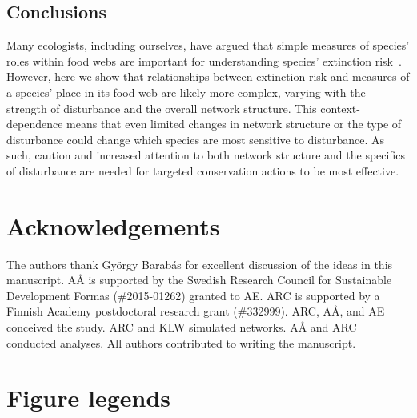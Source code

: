 \documentclass[12pt]{article}
\begin{document}
\begin{spacing}{2.0}
    
    \subsection*{Conclusions}
    
    Many ecologists, including ourselves, have argued that simple measures of species' roles within food webs are important for understanding species' extinction risk~\citep{Santos2021,dunne2009cascading, Eklof2006,binzer2011susceptibility}. 
    However, here we show that relationships between extinction risk and measures of a species' place in its food web are likely more complex, varying with the strength of disturbance and the overall network structure.
    This context-dependence means that even limited changes in network structure or the type of disturbance could change which species are most sensitive to disturbance. 
    As such, caution and increased attention to both network structure and the specifics of disturbance are needed for targeted conservation actions to be most effective. 
    
\section*{Acknowledgements}

    The authors thank Gy\"{o}rgy Barab\'{a}s for excellent discussion of the ideas in this manuscript. A{\AA} is supported by the Swedish Research Council for Sustainable Development Formas (\#2015-01262) granted to AE. ARC is supported by a Finnish Academy postdoctoral research grant (\#332999). ARC, A\r{A}, and AE conceived the study. ARC and KLW simulated networks. A\r{A} and ARC conducted analyses. All authors contributed to writing the manuscript.


 
 

\clearpage

\section*{Figure legends}
    


\end{spacing}
\end{document}
